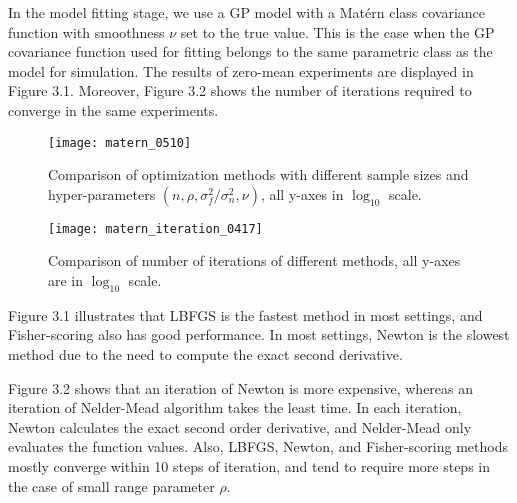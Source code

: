 In the model fitting stage, we use a GP model with a Mat\'ern class covariance function with smoothness $\nu$ set to the true value. This is the case when the GP covariance function used for fitting belongs to the same parametric class as the model for simulation. The results of zero-mean experiments are displayed in Figure 3.1. Moreover, Figure 3.2 shows the number of iterations required to converge in the same experiments. 

\begin{figure}[hbt!]%
  \centering
  \texttt{[image: matern\_0510]} %
  \caption[Times of simulated GP-Matern starting at default values: line graphs with range bars]%
  {Comparison of optimization methods with different sample sizes and hyper-parameters $(n,\rho, \sigma^2_f/\sigma^2_n, \nu)$, all y-axes in $\log_{10}$ scale.}%
  \label{fig:matern_default}
\end{figure}

\begin{figure}[hbt!]%
  \centering
  \texttt{[image: matern\_iteration\_0417]} %
  \caption[Number of iterations of simulated GP-matern starting at default values: line graphs with range bars]%
  {Comparison of number of iterations of different methods, all y-axes are in $\log_{10}$ scale.}%
  \label{fig:matern_iteration}
\end{figure}

Figure 3.1 illustrates that LBFGS is the fastest method in most settings, and Fisher-scoring also has good performance. In most settings, Newton is the slowest method due to the need to compute the exact second derivative. 

Figure 3.2 shows that an iteration of Newton is more expensive, whereas an iteration of Nelder-Mead algorithm takes the least time. In each iteration, Newton calculates the exact second order derivative, and Nelder-Mead only evaluates the function values. Also, LBFGS, Newton, and Fisher-scoring methods mostly converge within 10 steps of iteration, and tend to require more steps in the case of small range parameter $\rho$. 

